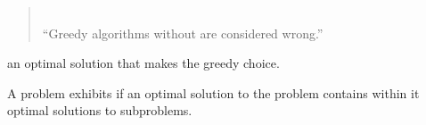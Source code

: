 
\begin{frame}{}
  \begin{quote}
    \centering
  \end{quote}


  \pause
  \begin{quote}
    \centering
     \\[6pt]
    {\large ``Greedy algorithms without  are considered wrong.''}
  \end{quote}
\end{frame}

\begin{frame}{}
  \begin{center}
  \end{center}

  \pause
  \vspace{0.30cm}
  \begin{theorem}
     an optimal solution that makes the greedy choice.
  \end{theorem}

  \vspace{0.50cm}
  \begin{theorem}
    A problem exhibits \emph{} if
    an optimal solution to the problem contains within it optimal solutions to subproblems.
  \end{theorem}
\end{frame}
